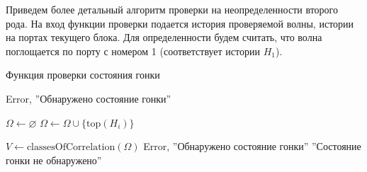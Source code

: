 \documentclass[10pt,a4paper]{article}
\newcommand{\FA}{F\!A}
\begin{document}
  Приведем более детальный алгоритм проверки на неопределенности второго рода.
  На вход функции проверки подается история проверяемой волны, истории на портах текущего блока. Для определенности будем считать, что
  волна поглощается по порту с номером 1 (соответствует истории $H_1$).
  
    \begin{algorithm}
    \caption{Функция проверки состояния гонки}
    \label{checkrace}
    \begin{algorithmic}[1]
          \State \Return Error, ''Обнаружено состояние гонки''
        \EndIf
        
        \Statex
        
        \State $\Omega \leftarrow \varnothing$
            \State $\Omega \leftarrow \Omega \cup \{\text{top}(H_i)\}$
          \EndIf
        \EndFor
        
        \Statex
        
        \State $V \leftarrow \text{classesOfCorrelation}(\Omega)$
            \If{$\FA_v(s, p \cup \{1\}) \neq \FA_v(s, p)$}
              \State \Return Error, ''Обнаружено состояние гонки''
            \EndIf
        \EndFor 
        \EndFor       
      \State \Return ''Состояние гонки не обнаружено''
      \EndFunction
    \end{algorithmic}
  \end{algorithm}
  
\end{document}
